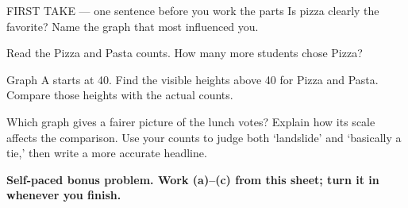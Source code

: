 \documentclass[14pt]{extarticle}
\begin{document}
\begin{firsttakebox}{FIRST TAKE --- one sentence before you work the parts}
Is pizza clearly the favorite? Name the graph that most influenced you.
\end{firsttakebox}

\begin{description}[leftmargin=1.15in, labelwidth=1in, itemsep=2pt, topsep=2pt]
  \item[\dokbadge{1}~(a)] Read the Pizza and Pasta counts. How many more students chose Pizza?
  \item[\dokbadge{2}~(b)] Graph A starts at 40. Find the visible heights above 40 for Pizza and Pasta. Compare those heights with the actual counts.
  \item[\dokbadge{3}~(c)] Which graph gives a fairer picture of the lunch votes? Explain how its scale affects the comparison. Use your counts to judge both `landslide' and `basically a tie,' then write a more accurate headline.
\end{description}

\vfill
\textbf{Self-paced bonus problem. Work (a)--(c) from this sheet; turn it in whenever you finish.}
\end{document}
